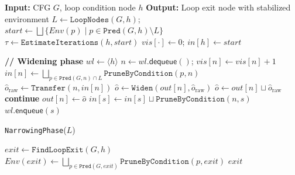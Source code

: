 \documentclass[11pt,oneside]{report}
\theoremstyle{plain}
\theoremstyle{definition}
\theoremstyle{remark}
\newcommand{\Env}{\mathit{Env}}
\begin{document}
\begin{algorithm}[!t]
\caption{Loop Fixpoint with Adaptive Widening}
\label{alg:fixpoint}
\small
\begin{algorithmic}[1]
\State \textbf{Input:} CFG $G$, loop condition node $h$
\State \textbf{Output:} Loop exit node with stabilized environment
  \State $L \gets \texttt{LoopNodes}(G, h)$; \quad $start \gets \bigsqcup\{\Env(p)\mid p\in\texttt{Pred}(G, h)\setminus L\}$
  \State $\tau \gets \texttt{EstimateIterations}(h, start)$ 
  \State $vis[\cdot]\gets 0$; \quad $in[h]\gets start$

  \State \textbf{// Widening phase}
  \State $wl\gets \langle h\rangle$
    \State $n\gets wl.\textsf{dequeue}()$; \quad $vis[n]\gets vis[n]+1$
       \State $in[n] \gets \bigsqcup_{p\in\texttt{Pred}(G, n)\cap L} \texttt{PruneByCondition}(p,n)$
    \EndIf
    \State $\hat{o}_{\text{raw}}\gets \texttt{Transfer}(n,in[n])$ 
       \State $\hat{o}\gets \texttt{Widen}(out[n],\hat{o}_{\text{raw}})$ 
    \Else \State $\hat{o}\gets out[n]\sqcup \hat{o}_{\text{raw}}$
    \EndIf
     \textbf{continue} 
    \EndIf
    \State $out[n]\gets \hat{o}$
      \State $in[s] \gets in[s] \sqcup \texttt{PruneByCondition}(n,s)$
      \State $wl.\textsf{enqueue}(s)$
    \EndFor
  \EndWhile

  \State \texttt{NarrowingPhase}($L$) 

  \State $exit \gets \texttt{FindLoopExit}(G, h)$
  \State $\Env(exit) \gets \bigsqcup_{p\in\texttt{Pred}(G, exit)} \texttt{PruneByCondition}(p,exit)$ 
  \State \Return $exit$
\EndFunction
\end{algorithmic}
\end{algorithm}
\end{document}
